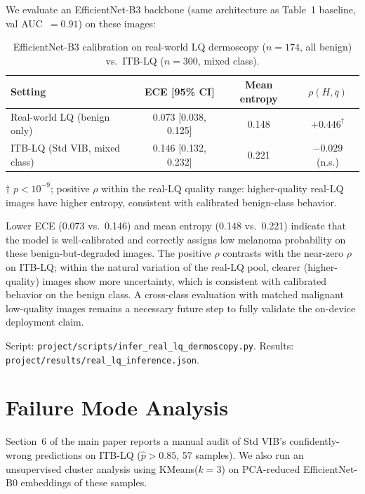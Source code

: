 \documentclass{bmvc2k}
\begin{document}
We evaluate an EfficientNet-B3 backbone (same architecture as Table~1 baseline, val AUC~$=0.91$) on these images:

\begin{table}[h]
\centering
\caption{EfficientNet-B3 calibration on real-world LQ dermoscopy ($n{=}174$, all benign) vs.\ ITB-LQ ($n{=}300$, mixed class).}
\label{tab:real_lq}
\begin{tabular}{lccc}
\toprule
Setting & ECE [95\% CI] & Mean entropy & $\rho(H,\bar q)$ \\
\midrule
Real-world LQ (benign only) & 0.073 [0.038, 0.125] & 0.148 & $+0.446^\dagger$ \\
ITB-LQ (Std VIB, mixed class) & 0.146 [0.132, 0.232] & 0.221 & $-0.029$ (n.s.) \\
\bottomrule
\end{tabular}
\begin{flushleft}
{\footnotesize $\dagger$ $p{<}10^{-9}$; positive $\rho$ within the real-LQ quality range: higher-quality real-LQ images have higher entropy, consistent with calibrated benign-class behavior.}
\end{flushleft}
\end{table}

Lower ECE (0.073 vs.\ 0.146) and mean entropy (0.148 vs.\ 0.221) indicate that the model is well-calibrated and correctly assigns low melanoma probability on these benign-but-degraded images. The positive $\rho$ contrasts with the near-zero $\rho$ on ITB-LQ; within the natural variation of the real-LQ pool, clearer (higher-quality) images show more uncertainty, which is consistent with calibrated behavior on the benign class. A cross-class evaluation with matched malignant low-quality images remains a necessary future step to fully validate the on-device deployment claim.

Script: \texttt{project/scripts/infer\_real\_lq\_dermoscopy.py}.
Results: \texttt{project/results/real\_lq\_inference.json}.

\section{Failure Mode Analysis}
\label{app:failure}

Section~6 of the main paper reports a manual audit of Std VIB's confidently-wrong predictions on ITB-LQ ($\hat p > 0.85$, 57 samples). We also run an unsupervised cluster analysis using KMeans($k{=}3$) on PCA-reduced EfficientNet-B0 embeddings of these samples.
\end{document}
